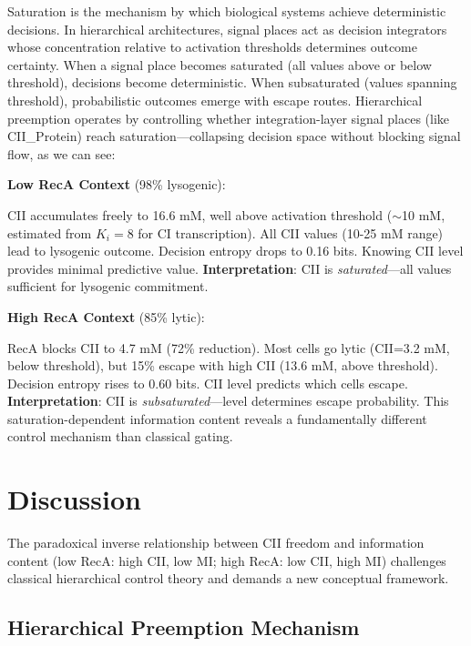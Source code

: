 \documentclass[10pt,twocolumn]{article}
\begin{document}
\noindent Saturation is the mechanism by which biological systems achieve deterministic decisions. In hierarchical architectures, signal places act as decision integrators whose concentration relative to activation thresholds determines outcome certainty. When a signal place becomes saturated (all values above or below threshold), decisions become deterministic. When subsaturated (values spanning threshold), probabilistic outcomes emerge with escape routes. Hierarchical preemption operates by controlling whether integration-layer signal places (like CII\_Protein) reach saturation—collapsing decision space without blocking signal flow, as we can see:

\vspace{6pt}
\noindent\textbf{Low RecA Context} (98\% lysogenic):

\noindent CII accumulates freely to 16.6 mM, well above activation threshold ($\sim$10 mM, estimated from $K_i=8$ for CI transcription). All CII values (10-25 mM range) lead to lysogenic outcome. Decision entropy drops to 0.16 bits. Knowing CII level provides minimal predictive value.
\noindent\textbf{Interpretation}: CII is \textit{saturated}—all values sufficient for lysogenic commitment.

\vspace{6pt}
\noindent\textbf{High RecA Context} (85\% lytic):

\noindent RecA blocks CII to 4.7 mM (72\% reduction). Most cells go lytic (CII=3.2 mM, below threshold), but 15\% escape with high CII (13.6 mM, above threshold). Decision entropy rises to 0.60 bits. CII level predicts which cells escape.
\noindent\textbf{Interpretation}: CII is \textit{subsaturated}—level determines escape probability. This saturation-dependent information content reveals a fundamentally different control mechanism than classical gating.

\section{Discussion}

The paradoxical inverse relationship between CII freedom and information content (low RecA: high CII, low MI; high RecA: low CII, high MI) challenges classical hierarchical control theory and demands a new conceptual framework.

\subsection{Hierarchical Preemption Mechanism}
\end{document}
